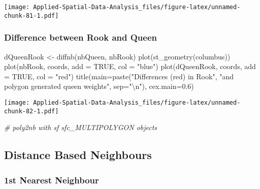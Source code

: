\documentclass[
]{book}
\newenvironment{Shaded}{\begin{snugshade}}{\end{snugshade}}
\newcommand{\AttributeTok}[1]{\textcolor[rgb]{0.77,0.63,0.00}{#1}}
\newcommand{\CommentTok}[1]{\textcolor[rgb]{0.56,0.35,0.01}{\textit{#1}}}
\newcommand{\ConstantTok}[1]{\textcolor[rgb]{0.00,0.00,0.00}{#1}}
\newcommand{\FloatTok}[1]{\textcolor[rgb]{0.00,0.00,0.81}{#1}}
\newcommand{\FunctionTok}[1]{\textcolor[rgb]{0.00,0.00,0.00}{#1}}
\newcommand{\NormalTok}[1]{#1}
\newcommand{\OtherTok}[1]{\textcolor[rgb]{0.56,0.35,0.01}{#1}}
\newcommand{\SpecialCharTok}[1]{\textcolor[rgb]{0.00,0.00,0.00}{#1}}
\newcommand{\StringTok}[1]{\textcolor[rgb]{0.31,0.60,0.02}{#1}}
\begin{document}
\texttt{[image: Applied-Spatial-Data-Analysis\_files/figure-latex/unnamed-chunk-81-1.pdf]}

\hypertarget{difference-between-rook-and-queen}{%
\subsubsection{Difference between Rook and Queen}\label{difference-between-rook-and-queen}}

\begin{Shaded}
\begin{Highlighting}[]
\NormalTok{dQueenRook }\OtherTok{\textless{}{-}} \FunctionTok{diffnb}\NormalTok{(nbQueen, nbRook)}
\FunctionTok{plot}\NormalTok{(}\FunctionTok{st\_geometry}\NormalTok{(columbus))}
\FunctionTok{plot}\NormalTok{(nbRook, coords, }\AttributeTok{add =} \ConstantTok{TRUE}\NormalTok{, }\AttributeTok{col =} \StringTok{"blue"}\NormalTok{)}
\FunctionTok{plot}\NormalTok{(dQueenRook, coords, }\AttributeTok{add =} \ConstantTok{TRUE}\NormalTok{, }\AttributeTok{col =} \StringTok{"red"}\NormalTok{)}
\FunctionTok{title}\NormalTok{(}\AttributeTok{main=}\FunctionTok{paste}\NormalTok{(}\StringTok{"Differences (red) in Rook"}\NormalTok{,}
 \StringTok{"and polygon generated queen weights"}\NormalTok{, }\AttributeTok{sep=}\StringTok{"}\SpecialCharTok{\textbackslash{}n}\StringTok{"}\NormalTok{), }\AttributeTok{cex.main=}\FloatTok{0.6}\NormalTok{)}
\end{Highlighting}
\end{Shaded}

\texttt{[image: Applied-Spatial-Data-Analysis\_files/figure-latex/unnamed-chunk-82-1.pdf]}

\begin{Shaded}
\begin{Highlighting}[]
\CommentTok{\# poly2nb with sf sfc\_MULTIPOLYGON objects}
\end{Highlighting}
\end{Shaded}

\hypertarget{distance-based-neighbours}{%
\subsection{Distance Based Neighbours}\label{distance-based-neighbours}}

\hypertarget{st-nearest-neighbour}{%
\subsubsection{1st Nearest Neighbour}\label{st-nearest-neighbour}}
\end{document}
